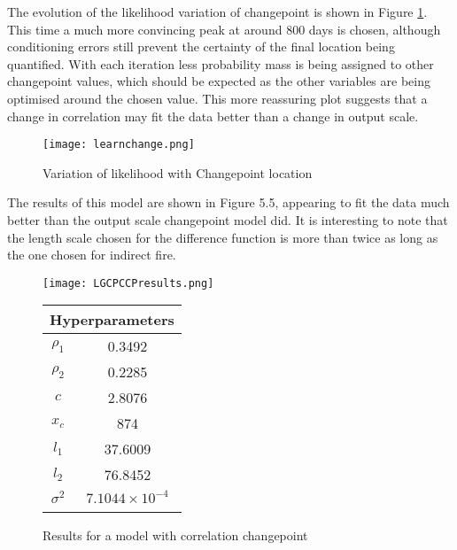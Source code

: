\documentclass[a4paper,11pt]{report}
\begin{document}
The evolution of the likelihood variation of changepoint is shown in Figure \ref{fig:cccpvariation}. This time a much more convincing peak at around 800 days is chosen, although conditioning errors still prevent the certainty of the final location being quantified. With each iteration less probability mass is being assigned to other changepoint values, which should be expected as the other variables are being optimised around the chosen value. This more reassuring plot suggests that a change in correlation may fit the data better than a change in output scale. \par


\begin{figure}
\centering
\texttt{[image: learnchange.png]}
\caption{Variation of likelihood with Changepoint location}
\label{fig:cccpvariation}
\end{figure}

The results of this model are shown in Figure 5.5, appearing to fit the data much better than the output scale changepoint model did. It is interesting to note that the length scale chosen for the difference function is more than twice as long as the one chosen for indirect fire.


  \begin{figure}[!ht]
    \centering
    \texttt{[image: LGCPCCPresults.png]}
    \qquad
    \doublespacing
    \begin{tabular}[b]{cc}
    \multicolumn{2}{c}{\textbf{Hyperparameters}}                                            \\ \hline
      \(\rho_1\)                    & 0.3492                \\                       
\(\rho_2\)                     & 0.2285                           \\            
\(c\)                               & 2.8076                                      \\ 
\(x_c\)                        & 874                                         \\ 
\(l_1\)                               & 37.6009                                      \\  
\(l_2\) & 76.8452 \\ 
\(\sigma^2\) & \(7.1044 \times 10^{-4}\) \\ 
& \\
    \end{tabular}
    \captionsetup{labelformat=andtable}
    \caption{Results for a model with correlation changepoint}
  \end{figure}
\end{document}
